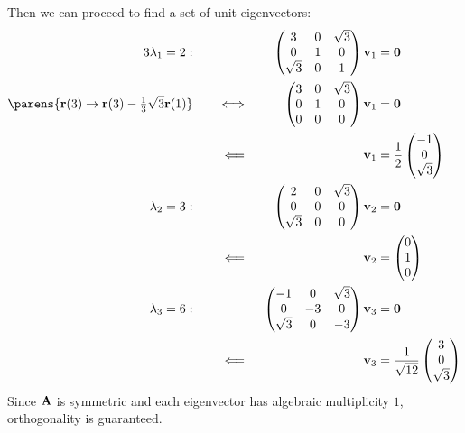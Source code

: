 \documentclass[fleqn,a4paper,11pt]{article}
\begin{document}
\begin{enumerate}[label=\textbf{\arabic*.}]
\begin{enumerate}[label=(\textbf{\Alph*})]
    Then we can proceed to find a set of unit eigenvectors:
    \begin{alignat*}3
     \lambda_1 = 2:\quad&& &&
     \begin{pmatrix}
      3 & 0 & \sqrt 3 \\
      0 & 1 & 0 \\
      \sqrt 3 & 0 & 1
     \end{pmatrix}
     \vec v_1 &= \vec 0 \\
     \parens{
      \vec r(3) \to \vec r(3) - \tfrac 13 \sqrt 3 \vec r(1)
     } \quad
     &&\iff{}&&
     \begin{pmatrix}
      3 & 0 & \sqrt 3 \\
      0 & 1 & 0 \\
      0 & 0 & 0
     \end{pmatrix}
     \vec v_1 &= \vec 0 \\
     &&\impliedby{}&&
     \vec v_1 &= \frac 12\begin{pmatrix} -1 \\ 0 \\ \sqrt 3 \end{pmatrix} \\
     \lambda_2 = 3:\quad&& &&
     \begin{pmatrix}
      2 & 0 & \sqrt 3 \\
      0 & 0 & 0 \\
      \sqrt 3 & 0 & 0
     \end{pmatrix}
     \vec v_2 &= \vec 0 \\
     &&\impliedby{}&&
     \vec v_2 &= \begin{pmatrix} 0 \\ 1 \\ 0 \end{pmatrix} \\
     \lambda_3 = 6:\quad&& &&
     \begin{pmatrix}
      -1 & 0 & \sqrt 3 \\
      0 & -3 & 0 \\
      \sqrt 3 & 0 & -3
     \end{pmatrix}
     \vec v_3 &= \vec 0 \\
     &&\impliedby{}&&
     \vec v_3 &= \frac 1{\sqrt{12}}
                 \begin{pmatrix} 3 \\ 0 \\ \sqrt 3 \end{pmatrix}
    \end{alignat*}
    Since \(\mathbf{A}\) is symmetric and each eigenvector has algebraic
    multiplicity \(1\), orthogonality is guaranteed.


\end{enumerate}
\end{enumerate}
\end{document}
